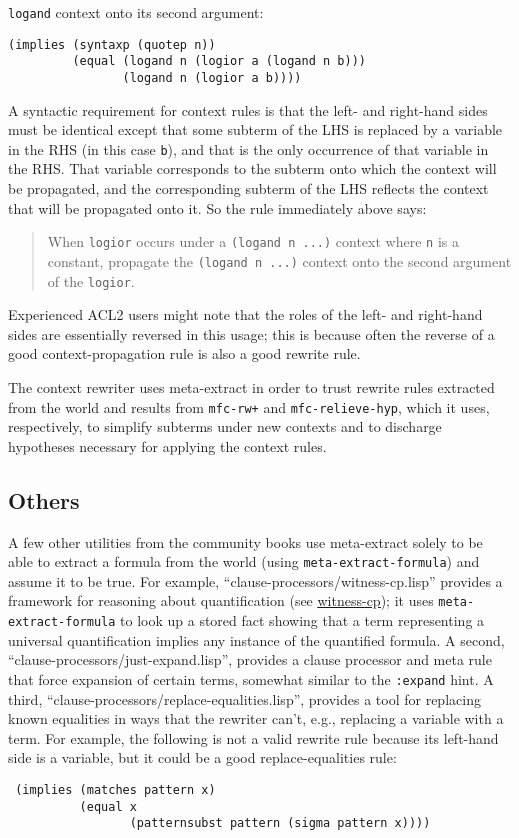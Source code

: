 \texttt{logand} context onto its second argument:
\begin{verbatim}
(implies (syntaxp (quotep n))
         (equal (logand n (logior a (logand n b)))
                (logand n (logior a b))))
\end{verbatim}
\noindent A syntactic requirement for context rules is that the left-
and right-hand sides must be identical except that some subterm of the
LHS is replaced by a variable in the RHS (in this case \texttt{b}),
and that is the only occurrence of that variable in the RHS.  That
variable corresponds to the subterm onto which the context will be
propagated, and the corresponding subterm of the LHS reflects the
context that will be propagated onto it.  So the rule immediately above says:
\begin{quote}
When \texttt{logior} occurs under a \texttt{(logand n ...)} context where
\texttt{n} is a constant, propagate the \texttt{(logand n ...)} context
onto the second argument of the \texttt{logior}.
\end{quote}
\noindent Experienced ACL2 users might note that the roles of the
left- and right-hand sides are essentially reversed in this usage;
this is because often the reverse of a good context-propagation rule
is also a good rewrite rule.

The context rewriter uses meta-extract in order to trust rewrite rules
extracted from the world and results from \texttt{mfc-rw+} and
\texttt{mfc-relieve-hyp}, which it uses, respectively, to simplify
subterms under new contexts and to discharge hypotheses necessary for
applying the context rules.

\subsection{Others}

A few other utilities from the community books use
meta-extract solely to be able to extract a formula from the world
(using \texttt{meta-extract-formula}) and assume it to be true.  For
example, ``clause-processors/witness-cp.lisp'' provides a framework
for reasoning about quantification (see
\href{http://www.cs.utexas.edu/users/moore/acl2/manuals/current/manual/index.html?topic=ACL2\_\_\_\_WITNESS-CP}{\underline{witness-cp}});
it uses \texttt{meta-extract-formula} to look up a stored fact showing
that a term representing a universal quantification implies any
instance of the quantified formula.  A second,
``clause-processors/just-expand.lisp'', provides a clause processor
and meta rule that force expansion of certain terms, somewhat similar
to the \texttt{:expand} hint.  A third,
``clause-processors/replace-equalities.lisp'', provides a tool for
replacing known equalities in ways that the
rewriter can't, e.g., replacing a variable with a term.  For example, the
following is not a valid rewrite rule because its left-hand side is a
variable, but it could be a good replace-equalities rule:
\begin{verbatim}
 (implies (matches pattern x)
          (equal x
                 (patternsubst pattern (sigma pattern x))))
\end{verbatim}

